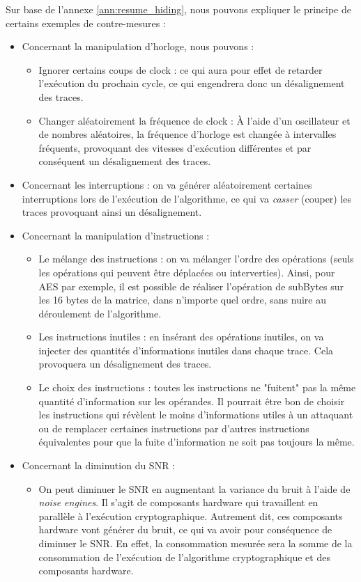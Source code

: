 \documentclass[10pt, oneside, a4paper]{article}
\begin{document}
\hspace{-0.5 cm}Sur base de l'annexe \ref{ann:resume_hiding}, nous pouvons expliquer le principe de certains exemples de contre-mesures :
\begin{itemize}
\item Concernant la manipulation d’horloge, nous pouvons :
\begin{itemize}
\item Ignorer certains coups de clock : ce qui aura pour effet de retarder l’exécution du prochain cycle, ce qui engendrera donc un désalignement des traces.
\item Changer aléatoirement la fréquence de clock : À l’aide d’un oscillateur et de nombres aléatoires, la fréquence d’horloge est changée à intervalles fréquents, provoquant des vitesses d’exécution différentes et par conséquent un désalignement des traces.
\end{itemize}
\item Concernant les interruptions : on va générer aléatoirement certaines interruptions lors de l'exécution de l'algorithme, ce qui va \textit{casser} (couper) les traces provoquant ainsi un désalignement.
\item Concernant la manipulation d'instructions : 
\begin{itemize}
\item Le mélange des instructions : on va mélanger l’ordre des opérations (seuls les opérations qui peuvent être déplacées ou interverties). Ainsi, pour AES par exemple, il est possible de réaliser l’opération de subBytes sur les 16 bytes de la matrice, dans n’importe quel ordre, sans nuire au déroulement de l’algorithme.
\item Les instructions inutiles : en insérant des opérations inutiles, on va injecter des quantités d'informations inutiles dans chaque trace. Cela provoquera un désalignement des traces.
\item Le choix des instructions : toutes les instructions ne "fuitent" pas la même quantité d’information sur les opérandes. Il pourrait être bon de choisir les instructions qui révèlent le moins d’informations utiles à un attaquant ou de remplacer certaines instructions par d’autres instructions équivalentes pour que la fuite d’information ne soit pas toujours la même.
\end{itemize}
\item Concernant la diminution du SNR :
\begin{itemize}
\item On peut diminuer le SNR en augmentant la variance du bruit à l'aide de \textit{noise engines}. Il s'agit de composants hardware qui travaillent en parallèle à l’exécution cryptographique. Autrement dit, ces composants hardware vont générer du bruit, ce qui va avoir pour conséquence de diminuer le SNR. En effet, la consommation mesurée sera la somme de la consommation de l’exécution de l’algorithme cryptographique et des composants hardware.

\end{itemize}
\end{itemize}
\end{document}
